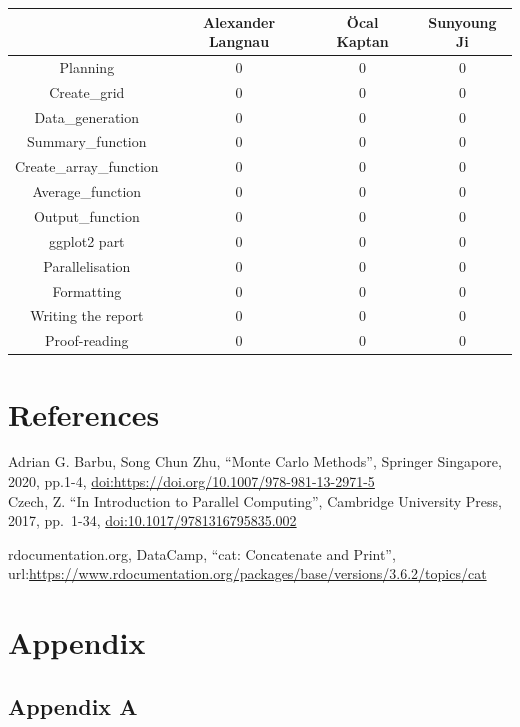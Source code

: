 \documentclass[11pt,a4paper]{article}
\begin{document}
\begin{longtable}[]{@{}cccc@{}}
\toprule()
& Alexander Langnau & Öcal Kaptan & Sunyoung Ji \\
\midrule()
\endhead
Planning & 0 & 0 & 0 \\
Create\_grid & 0 & 0 & 0 \\
Data\_generation & 0 & 0 & 0 \\
Summary\_function & 0 & 0 & 0 \\
Create\_array\_function & 0 & 0 & 0 \\
Average\_function & 0 & 0 & 0 \\
Output\_function & 0 & 0 & 0 \\
ggplot2 part & 0 & 0 & 0 \\
Parallelisation & 0 & 0 & 0 \\
Formatting & 0 & 0 & 0 \\
Writing the report & 0 & 0 & 0 \\
Proof-reading & 0 & 0 & 0 \\
\bottomrule()
\end{longtable}

\pagebreak

\hypertarget{references}{%
\section{References}\label{references}}

Adrian G. Barbu, Song Chun Zhu, ``Monte Carlo Methods'', Springer
Singapore, 2020, pp.1-4,
\url{doi:https://doi.org/10.1007/978-981-13-2971-5}\\

Czech, Z. ``In Introduction to Parallel Computing'', Cambridge
University Press, 2017, pp.~1-34, \url{doi:10.1017/9781316795835.002}

rdocumentation.org, DataCamp, ``cat: Concatenate and Print'',
url:\url{https://www.rdocumentation.org/packages/base/versions/3.6.2/topics/cat}

\pagebreak

\hypertarget{appendix}{%
\section{Appendix}\label{appendix}}

\hypertarget{appendix-a}{%
\subsection{Appendix A}\label{appendix-a}}
\end{document}
